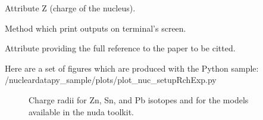 \documentclass[letterpaper,10pt,english]{sphinxmanual}
\begin{document}
\begin{fulllineitems}
\begin{fulllineitems}
\end{fulllineitems}


\begin{fulllineitems}
\label{\detokenize{source/api/setup_nuc_rch_exp:nucleardatapy.nuc.setup_rch_exp.setupRchExp.nucZ}}
\pysigstartsignatures
{}
\pysigstopsignatures
\sphinxAtStartPar
Attribute Z (charge of the nucleus).

\end{fulllineitems}


\begin{fulllineitems}
\label{\detokenize{source/api/setup_nuc_rch_exp:nucleardatapy.nuc.setup_rch_exp.setupRchExp.print_outputs}}
\pysigstartsignatures
{}
\pysigstopsignatures
\sphinxAtStartPar
Method which print outputs on terminal’s screen.

\end{fulllineitems}


\begin{fulllineitems}
\label{\detokenize{source/api/setup_nuc_rch_exp:nucleardatapy.nuc.setup_rch_exp.setupRchExp.ref}}
\pysigstartsignatures
{}
\pysigstopsignatures
\sphinxAtStartPar
Attribute providing the full reference to the paper to be citted.

\end{fulllineitems}


\end{fulllineitems}


\sphinxAtStartPar
Here are a set of figures which are produced with the Python sample: /nucleardatapy\_sample/plots/plot\_nuc\_setupRchExp.py

\begin{figure}[htbp]
\centering
\capstart

\noindent{}
\caption{Charge radii for Zn, Sn, and Pb isotopes and for the models available in the nuda toolkit.}\label{\detokenize{source/api/setup_nuc_rch_exp:id1}}\end{figure}
\end{document}
